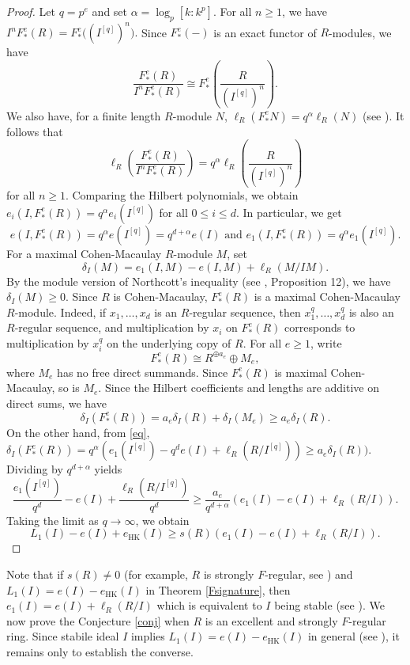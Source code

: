 \documentclass[11pt, reqno]{amsart}
\theoremstyle{plain}
\theoremstyle{plain}
\begin{document}
\begin{proof}
Let $q=p^e$ and set $\alpha=\log_p [k:k^p].$ For all $n\geq 1$, we have $I^nF_*^e(R) =F_*^e\bigl((I^{[q]})^n\bigr).$ Since $F^e_*(-)$ is an exact functor of $R$-modules, we have
$$\frac{F_*^e(R)}{I^nF_*^e(R)}
\cong
F_*^e\left(\frac{R}{(I^{[q]})^n}\right).$$ We also have, for a finite length $R$-module $N$, $\ell_R(F_*^eN)=q^\alpha\ell_R(N)$ (see \cite[2.1]{Tucker12}). It follows that
$$\ell_R\left(\frac{F_*^e(R)}{I^nF_*^e(R)}\right)
=q^\alpha \ell_R\left(\frac{R}{(I^{[q]})^n}\right)$$
for all $n\geq1$. Comparing the Hilbert polynomials, we obtain
$e_i(I,F_*^e(R))=q^\alpha e_i(I^{[q]})$ for all $0\leq i\leq d$. In particular, we get
\begin{equation} \label{eq}
    e(I,F_*^e(R))=q^\alpha e(I^{[q]})=q^{d+\alpha}e(I) \text{ and } e_1(I,F_*^e(R))=q^\alpha e_1(I^{[q]}).
\end{equation}
For a maximal Cohen-Macaulay $R$-module $M$, set
$$\delta_I(M)=e_1(I,M)-e(I,M)+\ell_R(M/IM).$$
By the module version of Northcott's inequality (see \cite{HCCMM}, Proposition 12), we have $\delta_I(M)\geq0$. Since $R$ is Cohen-Macaulay, $F_*^e(R)$ is a maximal Cohen-Macaulay $R$-module. Indeed, if $x_1,\ldots,x_d$ is an $R$-regular sequence, then $x_1^q,\ldots,x_d^q$ is also an $R$-regular sequence, and
multiplication by $x_i$ on $F_*^e(R)$ corresponds to multiplication by $x_i^q$ on the underlying copy of $R$. For all $e\geq 1$, write $$F_*^e(R) \cong R^{\oplus a_e}\oplus M_e,$$
where $M_e$ has no free direct summands. Since $F_*^e(R)$ is maximal Cohen-Macaulay, so is $M_e$. Since the Hilbert coefficients and lengths are additive on direct sums, we have
$$\delta_I(F_*^e(R))=a_e\delta_I(R)+\delta_I(M_e)\geq a_e\delta_I(R).$$
On the other hand, from \eqref{eq},
$\displaystyle \delta_I(F_*^e(R)) =q^\alpha(e_1(I^{[q]})-q^de(I)+\ell_R(R/I^{[q]}))\geq a_e\delta_I(R)).$ Dividing by $q^{d+\alpha}$ yields
$$\frac{e_1(I^{[q]})}{q^d}-e(I)+\frac{\ell_R(R/I^{[q]})}{q^d}
\geq\frac{a_e}{q^{d+\alpha}}(e_1(I)-e(I)+\ell_R(R/I)).$$
Taking the limit as $q\to\infty$, we obtain
$$L_1(I)-e(I)+e_{\mathrm{HK}}(I) \geq s(R)(e_1(I)-e(I)+\ell_R(R/I)).$$
\end{proof}

Note that if $s(R)\neq 0$ (for example, $R$ is strongly $F$-regular, see \cite[Theorem 0.2]{AL03}) and $L_1(I)=e(I)-e_{\mathrm{HK}}(I)$ in Theorem \ref{Fsignature}, then $e_1(I)=e(I)+\ell_R(R/I)$ which is equivalent to $I$ being stable (see \cite[Theorem 16]{HCCMM}). We now prove the Conjecture \ref{conj} when $R$ is an excellent and strongly $F$-regular ring. Since stabile ideal $I$ implies $L_1(I)=e(I)-e_{\mathrm{HK}}(I)$ in general (see \cite[Theorem 1.8(2)]{watanabe}), it remains only to establish the converse.
\end{document}
